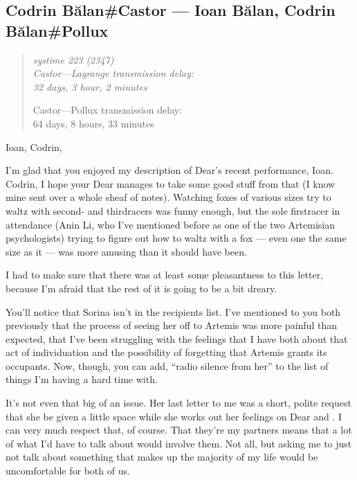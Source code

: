 \hypertarget{codrin-bux103lancastor-ioan-bux103lan-codrin-bux103lanpollux}{%
\subsection{Codrin Bălan\#Castor — Ioan Bălan, Codrin Bălan\#Pollux}\label{codrin-bux103lancastor-ioan-bux103lan-codrin-bux103lanpollux}}

\begin{quote}
\itshape
systime 223 (2347)\\

Castor---Lagrange transmission delay:\\
32 days, 3 hour, 2 minutes

Castor---Pollux transmission delay:\\
64 days, 8 hours, 33 minutes
\end{quote}

Ioan, Codrin,

I'm glad that you enjoyed my description of Dear's recent performance, Ioan. Codrin, I hope your Dear manages to take some good stuff from that (I know mine sent over a whole sheaf of notes). Watching foxes of various sizes try to waltz with second- and thirdracers was funny enough, but the sole firstracer in attendance (Anin Li, who I've mentioned before as one of the two Artemisian psychologists) trying to figure out how to waltz with a fox — even one the same size as it — was more amusing than it should have been.

I had to make sure that there was at least some pleasantness to this letter, because I'm afraid that the rest of it is going to be a bit dreary.

You'll notice that Sorina isn't in the recipients list. I've mentioned to you both previously that the process of seeing her off to Artemis was more painful than expected, that I've been struggling with the feelings that I have both about that act of individuation and the possibility of forgetting that Artemis grants its occupants. Now, though, you can add, ``radio silence from her'' to the list of things I'm having a hard time with.

It's not even that big of an issue. Her last letter to me was a short, polite request that she be given a little space while she works out her feelings on Dear and \Partner . I can very much respect that, of course. That they're my partners means that a lot of what I'd have to talk about would involve them. Not all, but asking me to just not talk about something that makes up the majority of my life would be uncomfortable for both of us.

